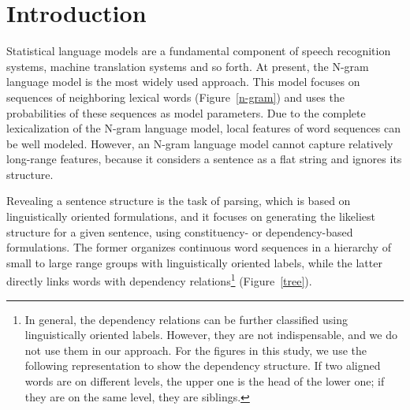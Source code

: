\documentclass[english]{jnlp_1.4}
\begin{document}
\maketitle

\section{Introduction}
\vspace{-0.5\Cvs}

Statistical language models are a fundamental component of speech recognition systems, machine translation systems and so forth. 
At present, the N-gram language model is the most widely used approach. This model focuses on sequences of neighboring lexical words (Figure~\ref{n-gram}) and uses the probabilities of these sequences as model parameters. Due to the complete lexicalization of the N-gram language model, local features of word sequences can be well modeled. However, an N-gram language model cannot capture relatively long-range features, because it considers a sentence as a flat string and ignores its structure.

Revealing a sentence structure is the task of parsing, which is based on linguistically oriented formulations, and it focuses on generating the likeliest structure for a given sentence, using  constituency- or dependency-based formulations. The former organizes continuous word sequences in a hierarchy of small to large range groups with linguistically oriented labels, while the latter directly links words with dependency relations\footnote{In general, the dependency relations can be further classified using linguistically oriented labels. However, they are not indispensable, and we do not use them in our approach. For the figures in this study, we use the following representation to show the dependency structure. If two aligned words are on different levels, the upper one is the head of the lower one; if they are on the same level, they are siblings.} (Figure~\ref{tree}).
\end{document}
